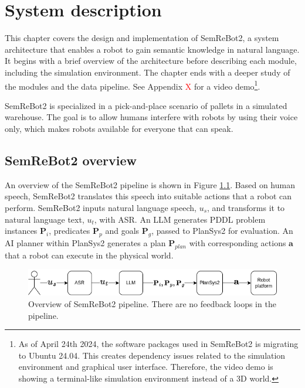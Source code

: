 \chapter{System description}
This chapter covers the design and implementation of SemReBot2, a system architecture that enables a robot to gain semantic knowledge in natural language. It begins with a brief overview of the architecture before describing each module, including the simulation environment. The chapter ends with a deeper study of the modules and the data pipeline. See Appendix \textcolor{red}{X} for a video demo\footnote{As of April 24th 2024, the software packages used in SemReBot2 is migrating to Ubuntu 24.04. This creates dependency issues related to the simulation environment and graphical user interface\cite{stinkyelias_source_2024}. Therefore, the video demo is showing a terminal-like simulation environment instead of a 3D world.}.

SemReBot2 is specialized in a pick-and-place scenario of pallets in a simulated warehouse. The goal is to allow humans interfere with robots by using their voice only, which makes robots available for everyone that can speak. 

\section{SemReBot2 overview}
An overview of the SemReBot2 pipeline is shown in Figure \ref{fig:semrebot2_overview}. Based on human speech, SemReBot2 translates this speech into suitable actions that a robot can perform. SemReBot2 inputs natural language speech, $u_{s}$, and transforms it to natural language text, $u_{t}$, with ASR. An LLM generates PDDL problem instances $\mathbf{P}_{i}$, predicates $\mathbf{P}_{p}$ and goals $\mathbf{P}_{g}$, passed to PlanSys2 for evaluation. An AI planner within PlanSys2 generates a plan $\mathbf{P}_{plan}$ with corresponding actions $\mathbf{a}$ that a robot can execute in the physical world.

\begin{figure}[h]
    \centering
    \includegraphics[width=\textwidth]{figures/overview_semrebot2.png}
    \caption[SemReBot2 overview]{Overview of SemReBot2 pipeline. There are no feedback loops in the pipeline.}
    \label{fig:semrebot2_overview}
\end{figure}

